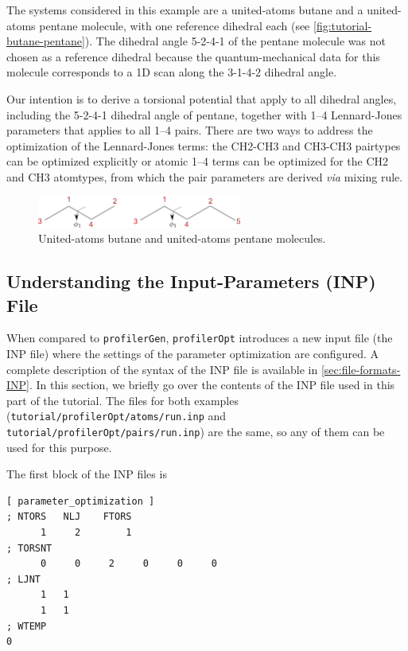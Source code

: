 \documentclass[10pt,a4paper,openany]{memoir}
\numberwithin{equation}{section}
\newcommand{\profileropt}[0]{\texttt{profilerOpt}}
\newcommand{\profilergen}[0]{\texttt{profilerGen}}
\begin{document}
The systems considered in this example are a united-atoms butane and a
united-atoms pentane molecule, with one reference dihedral each (see
\autoref{fig:tutorial-butane-pentane}).  The dihedral angle 5-2-4-1 of
the pentane molecule was not chosen as a reference dihedral because the
quantum-mechanical data for this molecule corresponds to a 1D scan along
the 3-1-4-2 dihedral angle.
%

Our intention is to derive a torsional potential that apply to all
dihedral angles, including the 5-2-4-1 dihedral angle of pentane,
together with 1--4 Lennard-Jones parameters that applies to all 1--4
pairs.
%
There are two ways to address the optimization of the Lennard-Jones
terms: the CH2-CH3 and CH3-CH3 pairtypes can be optimized explicitly
or atomic 1--4 terms can be optimized for the CH2 and CH3 atomtypes,
from which the pair parameters are derived \textit{via} mixing rule.
%

\begin{figure}[tb]
  \centering
  \includegraphics[width=0.6\textwidth]{butane_pentane}
  \caption{United-atoms butane and united-atoms pentane molecules.}
  \label{fig:tutorial-butane-pentane}
\end{figure}

\subsection{Understanding the Input-Parameters (INP) File}
\label{sec:tutorial-profileropt-inp}

When compared to \profilergen{}, \profileropt{} introduces a new input
file (the INP file) where the settings of the parameter optimization
are configured.
%
A complete description of the syntax of the INP file is available in
\autoref{sec:file-formats-INP}.
%
In this section, we briefly go over the contents of the INP file used
in this part of the tutorial.
%
The files for both examples
(\texttt{tutorial/profilerOpt/atoms/run.inp} and
\texttt{tutorial/profilerOpt/pairs/run.inp}) are the same, so any of
them can be used for this purpose.

The first block of the INP files is

\begin{lstlisting}[language=gromacs]
[ parameter_optimization ]
; NTORS   NLJ    FTORS
      1     2        1
; TORSNT
      0     0     2     0     0     0
; LJNT
      1   1
      1   1
; WTEMP
0
\end{lstlisting}\vspace{2ex}\par
\end{document}
